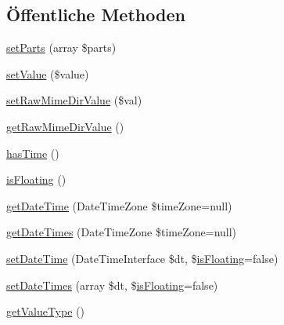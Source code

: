 \subsection*{Öffentliche Methoden}
\begin{DoxyCompactItemize}
\item 
\mbox{\hyperlink{class_sabre_1_1_v_object_1_1_property_1_1_i_calendar_1_1_date_time_aea44d2e1c0a51c006f511eadf13a2b29}{set\+Parts}} (array \$parts)
\item 
\mbox{\hyperlink{class_sabre_1_1_v_object_1_1_property_1_1_i_calendar_1_1_date_time_a12a54e201b2cc0cd30498d9f518e215e}{set\+Value}} (\$value)
\item 
\mbox{\hyperlink{class_sabre_1_1_v_object_1_1_property_1_1_i_calendar_1_1_date_time_afd08114ed7e735cf7772ce09a2ee0390}{set\+Raw\+Mime\+Dir\+Value}} (\$val)
\item 
\mbox{\hyperlink{class_sabre_1_1_v_object_1_1_property_1_1_i_calendar_1_1_date_time_aba9db4ab51611b3b3cdabba5a25c57ac}{get\+Raw\+Mime\+Dir\+Value}} ()
\item 
\mbox{\hyperlink{class_sabre_1_1_v_object_1_1_property_1_1_i_calendar_1_1_date_time_a236b3a536adde557469aa9c4be1d33ca}{has\+Time}} ()
\item 
\mbox{\hyperlink{class_sabre_1_1_v_object_1_1_property_1_1_i_calendar_1_1_date_time_a6533bc0cfa1add45a548471925832766}{is\+Floating}} ()
\item 
\mbox{\hyperlink{class_sabre_1_1_v_object_1_1_property_1_1_i_calendar_1_1_date_time_a089a9df90cf5fe48bc28e5c1efd6c983}{get\+Date\+Time}} (Date\+Time\+Zone \$time\+Zone=null)
\item 
\mbox{\hyperlink{class_sabre_1_1_v_object_1_1_property_1_1_i_calendar_1_1_date_time_ac8ee4f3b001ea8c5e66673c318753c81}{get\+Date\+Times}} (Date\+Time\+Zone \$time\+Zone=null)
\item 
\mbox{\hyperlink{class_sabre_1_1_v_object_1_1_property_1_1_i_calendar_1_1_date_time_a189b6cc5ecfad5e87714da7e52bdc7bd}{set\+Date\+Time}} (Date\+Time\+Interface \$dt, \$\mbox{\hyperlink{class_sabre_1_1_v_object_1_1_property_1_1_i_calendar_1_1_date_time_a6533bc0cfa1add45a548471925832766}{is\+Floating}}=false)
\item 
\mbox{\hyperlink{class_sabre_1_1_v_object_1_1_property_1_1_i_calendar_1_1_date_time_a01ed4bb2e40579e3999eb5ed438fefa3}{set\+Date\+Times}} (array \$dt, \$\mbox{\hyperlink{class_sabre_1_1_v_object_1_1_property_1_1_i_calendar_1_1_date_time_a6533bc0cfa1add45a548471925832766}{is\+Floating}}=false)
\item 
\mbox{\hyperlink{class_sabre_1_1_v_object_1_1_property_1_1_i_calendar_1_1_date_time_a1029c265bdd9e825c931d90ab4bfbd2a}{get\+Value\+Type}} ()

\end{DoxyCompactItemize}
